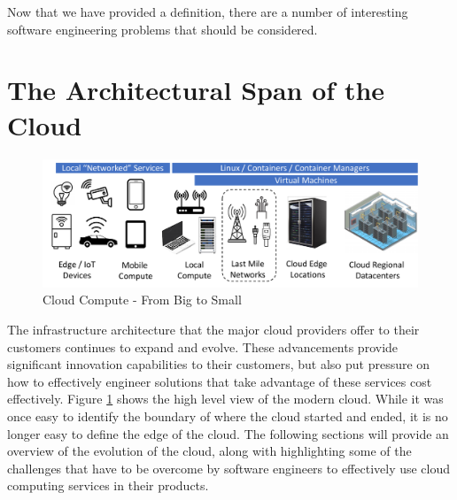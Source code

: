 \documentclass[conference]{IEEEconf}
\begin{document}
Now that we have provided a definition, there are a number of interesting software engineering problems that should be considered. 


\section{The Architectural Span of the Cloud}
\label{sec:CloudArchitecture}

\begin{figure}[t!]
	\includegraphics[width=\textwidth]{images/CloudTopo2.pdf}	
	\caption{Cloud Compute - From Big to Small}
	\label{fig:CloudTopo}
\end{figure}

The infrastructure architecture that the major cloud providers offer to their customers continues to expand and evolve.  These advancements provide significant innovation capabilities to their customers, but also put pressure on how to effectively engineer solutions that take advantage of these services cost effectively.  Figure \ref{fig:CloudTopo} shows the high level view of the modern cloud.  While it was once easy to identify the boundary of where the cloud started and ended, it is no longer easy to define the edge of the cloud.  The following sections will provide an overview of the evolution of the cloud, along with highlighting some of the challenges that have to be overcome by software engineers to effectively use cloud computing services in their products.
\end{document}
